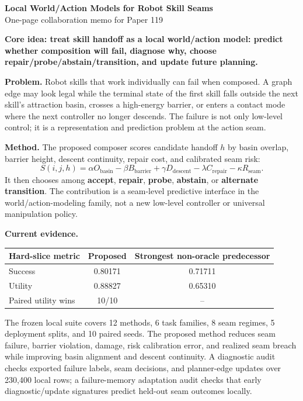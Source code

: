 \documentclass[10pt]{article}
\newcommand{\tagline}[1]{\colorbox{soft}{\parbox{\dimexpr\linewidth-2\fboxsep}{\textcolor{accent}{\textbf{#1}}}}}
\begin{document}
{\Large \textbf{Local World/Action Models for Robot Skill Seams}}\\[-1pt]
{\normalsize One-page collaboration memo for Paper 119}\\[3pt]
\tagline{Core idea: treat skill handoff as a local world/action model: predict whether composition will fail, diagnose why, choose repair/probe/abstain/transition, and update future planning.}

\textbf{Problem.}
Robot skills that work individually can fail when composed. A graph edge may look legal while the terminal state of the first skill falls outside the next skill's attraction basin, crosses a high-energy barrier, or enters a contact mode where the next controller no longer descends. The failure is not only low-level control; it is a representation and prediction problem at the action seam.

\textbf{Method.}
The proposed composer scores candidate handoff $h$ by basin overlap, barrier height, descent continuity, repair cost, and calibrated seam risk:
\[
S(i,j,h)=\alpha O_{\mathrm{basin}}-\beta B_{\mathrm{barrier}}+\gamma D_{\mathrm{descent}}-\lambda C_{\mathrm{repair}}-\kappa R_{\mathrm{seam}}.
\]
It then chooses among \textbf{accept}, \textbf{repair}, \textbf{probe}, \textbf{abstain}, or \textbf{alternate transition}. The contribution is a seam-level predictive interface in the world/action-modeling family, not a new low-level controller or universal manipulation policy.

\textbf{Current evidence.}
\begin{center}
\begin{tabular}{lcc}
\toprule
Hard-slice metric & Proposed & Strongest non-oracle predecessor \\
\midrule
Success & 0.80171 & 0.71711 \\
Utility & 0.88827 & 0.65310 \\
Paired utility wins & 10/10 & -- \\
\bottomrule
\end{tabular}
\end{center}
The frozen local suite covers 12 methods, 6 task families, 8 seam regimes, 5 deployment splits, and 10 paired seeds. The proposed method reduces seam failure, barrier violation, damage, risk calibration error, and realized seam breach while improving basin alignment and descent continuity. A diagnostic audit checks exported failure labels, seam decisions, and planner-edge updates over 230,400 local rows; a failure-memory adaptation audit checks that early diagnostic/update signatures predict held-out seam outcomes locally.
\end{document}
